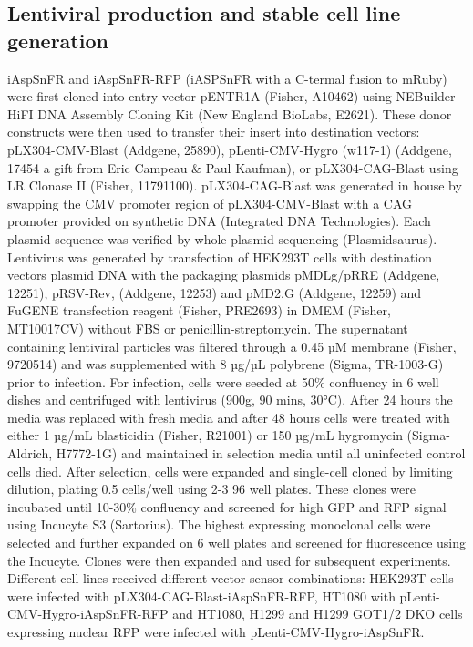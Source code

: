 \documentclass[9pt,lineno]{elife}
\begin{document}
\subsection{Lentiviral production and stable cell line generation}
iAspSnFR and iAspSnFR-RFP (iASPSnFR with a C-termal fusion to mRuby) were first cloned into entry vector pENTR1A (Fisher, A10462) using NEBuilder HiFI DNA Assembly Cloning Kit (New England BioLabs, E2621).
These donor constructs were then used to transfer their insert into destination vectors: pLX304-CMV-Blast (Addgene, 25890), pLenti-CMV-Hygro (w117-1) (Addgene, 17454 a gift from Eric Campeau \& Paul Kaufman), or pLX304-CAG-Blast using LR Clonase II (Fisher, 11791100).
pLX304-CAG-Blast was generated in house by swapping the CMV promoter region of pLX304-CMV-Blast with a CAG promoter provided on synthetic DNA (Integrated DNA Technologies).
Each plasmid sequence was verified by whole plasmid sequencing (Plasmidsaurus).
Lentivirus was generated by transfection of HEK293T cells with destination vectors plasmid DNA with the packaging plasmids pMDLg/pRRE (Addgene, 12251), pRSV-Rev, (Addgene, 12253) and pMD2.G (Addgene, 12259) and FuGENE transfection reagent (Fisher, PRE2693) in DMEM (Fisher, MT10017CV) without FBS or penicillin-streptomycin.
The supernatant containing lentiviral particles was filtered through a 0.45 µM membrane (Fisher, 9720514) and was supplemented with 8 µg/µL polybrene (Sigma, TR-1003-G) prior to infection.
For infection, cells were seeded at 50\% confluency in 6 well dishes and centrifuged with lentivirus (900g, 90 mins, 30°C).
After 24 hours the media was replaced with fresh media and after 48 hours cells were treated with either 1 µg/mL blasticidin (Fisher, R21001) or 150 µg/mL hygromycin (Sigma-Aldrich, H7772-1G) and maintained in selection media until all uninfected control cells died.
After selection, cells were expanded and single-cell cloned by limiting dilution, plating 0.5 cells/well using 2-3 96 well plates. These clones were incubated until 10-30\% confluency and screened for high GFP and RFP signal using Incucyte S3 (Sartorius).
The highest expressing monoclonal cells were selected and further expanded on 6 well plates and screened for fluorescence using the Incucyte.
Clones were then expanded and used for subsequent experiments.
Different cell lines received different vector-sensor combinations: HEK293T cells were infected with pLX304-CAG-Blast-iAspSnFR-RFP, HT1080 with pLenti-CMV-Hygro-iAspSnFR-RFP and HT1080, H1299 and H1299 GOT1/2 DKO cells expressing nuclear RFP were infected with pLenti-CMV-Hygro-iAspSnFR.
\end{document}
